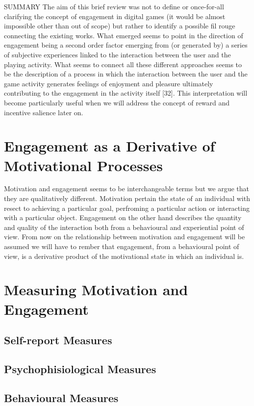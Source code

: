 SUMMARY
The aim of this brief review was not to define or once-for-all clarifying the concept of engagement in digital games (it would be almost impossible other than out of scope) but rather to identify a possible fil rouge connecting the existing works. What emerged seems to point in the direction of engagement being a second order factor emerging from (or generated by) a series of subjective experiences linked to the interaction between the user and the playing activity. What seems to connect all these different approaches seems to be the description of a process in which the interaction between the user and the game activity generates feelings of enjoyment and pleasure ultimately contributing to the engagement in the activity itself [32]. This interpretation will become particularly useful when we will address the concept of reward and incentive salience later on.

\section{Engagement as a Derivative of Motivational Processes}
Motivation and engagement seems to be interchangeable terms but we argue that they are qualitatively different. Motivation pertain the state of an individual with resect to achieving a particular goal, perfroming a particular action or interacting with a particular object. Engagement on the other hand describes the quantity and quality of the interaction both from a behavioural and experiential point of view. From now on the relationship between motivation and engagement will be assumed we will have to rember that engagement, from a behavioural point of view, is a derivative product of the motivational state in which an individual is. 

\section{Measuring Motivation and Engagement}
\label{measuring_motivation_engagement}
\lorem
    \subsection{Self-report Measures}
    \label{self_report}
    \lorem
    \subsection{Psychophisiological Measures}
    \label{psychophisio}
    \lorem
    \subsection{Behavioural Measures}
    \label{behavioural_indices}
    \lorem
